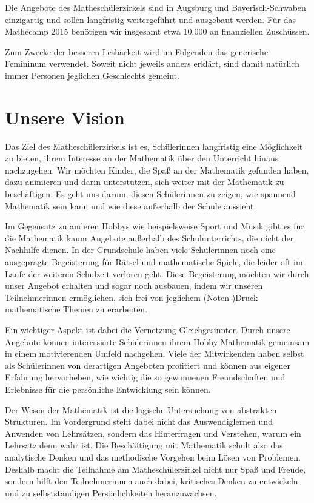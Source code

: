 \documentclass[12pt]{zettel}
\newcommand{\twopics}[2]{%
  \begin{figure}[b]%
    \vspace*{0.5cm}%
    \makebox[\textwidth][c]{%
      \texttt{[image: impressionen/\#1]}%
      \hspace*{1cm}%
      \texttt{[image: impressionen/\#2]}%
    }%
    \vspace*{-1cm}%
  \end{figure}
}
\begin{document}
Die Angebote des Matheschülerzirkels sind in Augsburg und Bayerisch-Schwaben einzigartig
und sollen langfristig weitergeführt und ausgebaut werden. Für das Mathecamp
2015 benötigen wir insgesamt etwa 10.000 \texteuro{} an finanziellen
Zuschüssen.

Zum Zwecke der besseren Lesbarkeit wird im Folgenden das generische Femininum verwendet. Soweit nicht jeweils anders erklärt, sind damit natürlich immer Personen jeglichen
Geschlechts gemeint.

\thispagestyle{empty}
\enlargethispage{4em}
\vspace{-2em}
\renewcommand\contentsname{}
\tableofcontents


\section{Unsere Vision}

Das Ziel des Matheschülerzirkels ist es, Schülerinnen langfristig eine Möglichkeit zu bieten, ihrem Interesse an der
Mathematik über den Unterricht hinaus nachzugehen. Wir möchten Kinder, die Spaß an der Mathematik gefunden haben, dazu animieren und darin unterstützen, sich weiter
mit der Mathematik zu beschäftigen. Es geht uns darum, diesen Schülerinnen zu zeigen, wie spannend Mathematik sein kann und wie diese außerhalb der Schule aussieht.

Im Gegensatz zu anderen Hobbys wie beispielsweise Sport und Musik gibt es für die Mathematik kaum Angebote außerhalb des Schulunterrichts, die nicht der Nachhilfe dienen.
In der Grundschule haben viele Schülerinnen noch eine ausgeprägte Begeisterung für 
Rätsel und mathematische Spiele, die leider oft im Laufe der weiteren
Schulzeit verloren geht. Diese Begeisterung möchten wir
durch unser Angebot erhalten und sogar noch ausbauen, indem wir
unseren Teilnehmerinnen ermöglichen, sich frei von jeglichem
(Noten-)Druck mathematische Themen zu erarbeiten.

\twopics{auftakt1}{auftakt2}

Ein wichtiger Aspekt ist dabei die Vernetzung Gleichgesinnter. Durch unsere Angebote können interessierte
Schülerinnen ihrem Hobby Mathematik gemeinsam in einem motivierenden Umfeld nachgehen. Viele der Mitwirkenden haben selbst als Schülerinnen von derartigen Angeboten
profitiert und können aus eigener Erfahrung hervorheben, wie wichtig die so gewonnenen Freundschaften und Erlebnisse für die persönliche Entwicklung sein können.

Der Wesen der Mathematik ist die logische Untersuchung von abstrakten Strukturen. Im Vordergrund steht dabei nicht das Auswendiglernen und Anwenden von Lehrsätzen, sondern
das Hinterfragen und Verstehen, warum ein Lehrsatz denn wahr ist. Die Beschäftigung mit Mathematik schult also das analytische Denken und das methodische Vorgehen beim Lösen
von Problemen. Deshalb macht die Teilnahme am Matheschülerzirkel nicht nur Spaß und Freude, sondern hilft den Teilnehmerinnen auch dabei, kritisches Denken
zu entwickeln und zu selbstständigen Persönlichkeiten heranzuwachsen.
\end{document}

